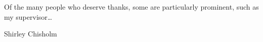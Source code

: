 \begin{acknowledgements}
  Of the many people who deserve thanks, some are particularly prominent,
  such as my supervisor\dots
\end{acknowledgements}




\tableofcontents
\listoffigures
\listoftables

%
  {Shirley Chisholm}
\thispagestyle{empty}
